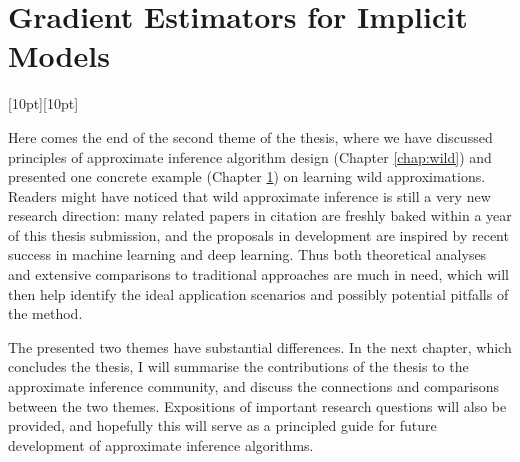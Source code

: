 \chapter{Gradient Estimators for Implicit Models}
\label{chap:grad_approx}

\ifpdf
    \graphicspath{{Chapter7/figs/Raster/}{Chapter7/figs/PDF/}{Chapter7/figs/}{Chapter7/}}
\else
    \graphicspath{{Chapter7/figs/Vector/}{Chapter7/figs/}{Chapter7/}}
\fi









\vspace{3em}
{\Large
\noindent \hrulefill \hspace{0.2cm} \raisebox{-4pt}[10pt][10pt]{\decofourleft ~  \decosix ~ \decofourright} \hspace{0.1cm} \hrulefill
\vspace{2em}
}

Here comes the end of the second theme of the thesis, where we have discussed principles of approximate inference algorithm design (Chapter \ref{chap:wild}) and presented one concrete example (Chapter \ref{chap:grad_approx}) on learning wild approximations. Readers might have noticed that wild approximate inference is still a very new research direction: many related papers in citation are freshly baked within a year of this thesis submission, and the proposals in development are inspired by recent success in machine learning and deep learning. Thus both theoretical analyses and extensive comparisons to traditional approaches are much in need, which will then help identify the ideal application scenarios and possibly potential pitfalls of the method.

The presented two themes have substantial differences. In the next chapter, which concludes the thesis, I will summarise the contributions of the thesis to the approximate inference community, and discuss the connections and comparisons between the two themes. Expositions of important research questions will also be provided, and hopefully this will serve as a principled guide for future development of approximate inference algorithms.